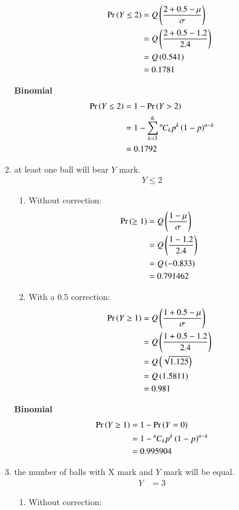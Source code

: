 \documentclass[journal,12pt,twocolumn]{IEEEtran}
\theoremstyle{remark}
\begin{document}
\begin{enumerate}[label=(\roman*)]
\begin{enumerate}[label=(\alph*)]
\begin{enumerate}
\begin{align}
\Pr\left(Y \leq 2\right) &= Q\left(\frac{2+0.5-\mu}{\sigma}\right) \\
 &= Q\left(\frac{2+0.5-1.2}{2.4}\right)\\
&= Q\left(0.541\right)\\
& = 0.1781 
\end{align}
\end{enumerate}
\textbf{Binomial}
\begin{align}
\Pr\left(Y\leq 2\right) &= 1 - \Pr\left(Y>2\right) \\
&= 1-\sum_{k=3}^{6} {{}^{n}\mkern-1muC_{k}}p^k\left(1-p\right)^{n-k} \\
&= 0.1792
\end{align}
\item at least one ball will bear $Y$ mark.\\
\begin{align}
Y\leq 2
\end{align}
\begin{enumerate}
\item Without correction:
\begin{align}
\Pr\left(\ge 1\right) &= Q\left(\frac{1-\mu}{\sigma}\right) \\
&= Q\left(\frac{1-1.2}{2.4}\right) \\
&= Q\left(-0.833\right) \\
& = 0.791462
\end{align}
\item With a 0.5 correction:
\begin{align}
\Pr\left(Y \ge 1\right) &= Q\left(\frac{1+0.5-\mu}{\sigma}\right) \\
 &= Q\left(\frac{1+0.5-1.2}{2.4}\right)\\
&= Q\left(\sqrt{1.125}\right)\\
 &= Q\left(1.5811\right) \\
&= 0.981 
\end{align}
\end{enumerate}
\textbf{Binomial}
\begin{align}
\Pr\left(Y\ge 1\right) &= 1 - \Pr\left(Y=0\right) \\
&= 1- {{}^{n}\mkern-1muC_{k}}p^k\left(1-p\right)^{n-k} \\
&=0.995904 
\end{align}
\item the number of balls with X mark and $Y$ mark will be equal.\\
\begin{align}
Y &= 3
\end{align}
\begin{enumerate}
\item Without correction:
\begin{align}

\end{align}
\end{enumerate}
\end{enumerate}
\end{enumerate}
\end{document}
